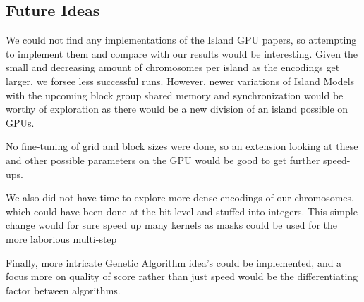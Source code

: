 \documentclass[11pt]{article}       %
\begin{document}
\subsection{Future Ideas}
We could not find any implementations of the Island GPU papers, so attempting to implement them and compare with our results would be interesting. Given the small and decreasing amount of chromosomes per island as the encodings get larger, we forsee less successful runs. However, newer variations of Island Models with the upcoming block group shared memory and synchronization would be worthy of exploration as there would be a new division of an island possible on GPUs.

No fine-tuning of grid and block sizes were done, so an extension looking at these and other possible parameters on the GPU would be good to get further speed-ups.

We also did not have time to explore more dense encodings of our chromosomes, which could have been done at the bit level and stuffed into integers. This simple change would for sure speed up many kernels as masks could be used for the more laborious multi-step

Finally, more intricate Genetic Algorithm idea's could be implemented, and a focus more on quality of score rather than just speed would be the differentiating factor between algorithms.





\end{document}
